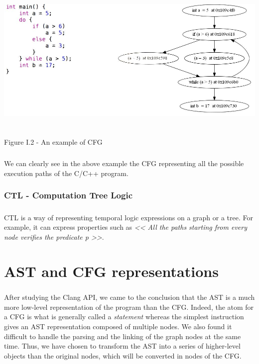 \documentclass{report}
\begin{document}
\begin{center}
\includegraphics[scale=0.4]{data/codeCFG.jpg}
~\\~\\Figure I.2 - An example of CFG
\end{center}

\paragraph{}
\hspace{4mm}We can clearly see in the above example the
CFG representing all the possible execution paths of the C/C++ program.

\subsection{CTL - Computation Tree Logic}

\paragraph{}
\hspace{4mm}CTL is a way of representing temporal logic expressions on a graph or a tree. For example, it can
express properties such as \textit{<< All the paths starting from every node verifies the predicate p >>}.

\chapter{AST and CFG representations}

\paragraph{}
\hspace{4mm}After studying the Clang API, we came to the conclusion that the AST is a much more low-level representation of the program than the CFG. 
Indeed, the atom for a CFG is what is generally called a \textit{statement} whereas the simplest instruction
gives an AST representation composed of multiple nodes. We also found it difficult to handle the parsing and the linking of the graph nodes at the same time.
Thus, we have chosen to transform the AST into a series of higher-level objects than the original nodes, which will be converted
in nodes of the CFG.
\end{document}
